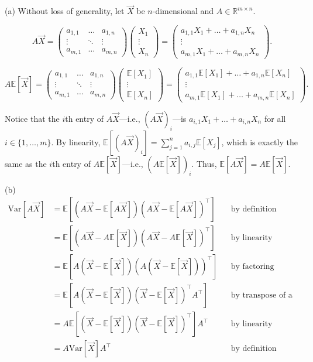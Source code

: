 \documentclass[12pt,oneside]{article}
\newcommand{\E}{\mathbb{E}}
\newcommand{\Var}{\text{Var}}
\newcommand{\R}{\mathbb{R}}
\theoremstyle{definition}
\theoremstyle{remark}
\begin{document}
\begin{solutionbox}
(a) Without loss of generality, let $\vec{X}$ be $n$-dimensional and $A \in \R^{m \times n}$.

\[
A \vec{X} = 
\begin{pmatrix}
a_{1, 1} & \ldots & a_{1, n} \\
\vdots & \ddots & \vdots \\
a_{m, 1} & \ldots & a_{m, n}
\end{pmatrix}
\begin{pmatrix}
X_{1} \\
\vdots \\
X_{n}
\end{pmatrix} = 
\begin{pmatrix}
a_{1, 1} X_{1} + \ldots + a_{1, n} X_{n} \\
\vdots \\
a_{m, 1} X_{1} + \ldots + a_{m, n} X_{n}
\end{pmatrix}.
\]

\[
A \E[\vec{X}] = 
\begin{pmatrix}
a_{1, 1} & \ldots & a_{1, n} \\
\vdots & \ddots & \vdots \\
a_{m, 1} & \ldots & a_{m, n}
\end{pmatrix}
\begin{pmatrix}
\E[X_{1}] \\
\vdots \\
\E[X_{n}]
\end{pmatrix} = 
\begin{pmatrix}
a_{1, 1} \E[X_{1}] + \ldots + a_{1, n} \E[X_{n}] \\
\vdots \\
a_{m, 1} \E[X_{1}] + \ldots + a_{m, n} \E[X_{n}]
\end{pmatrix}.
\]

Notice that the $i$th entry of $A \vec{X}$—i.e., $(A \vec{X})_{i}$—is $a_{i, 1} X_{1} + \ldots + a_{i, n} X_{n}$ for all $i \in \{1, \ldots, m\}$. By linearity, $\E[(A \vec{X})_i] = \sum_{j = 1}^{n} a_{i, j} \E[X_{j}]$, which is exactly the same as the $i$th entry of $A \E[\vec{X}]$—i.e., $(A \E[\vec{X}])_{i}$. Thus, $\E[A \vec{X}] = A \E[\vec{X}]$.

(b) 
\[
\begin{aligned}
\Var[A \vec{X}] &= \E[(A \vec{X} - \E[A \vec{X}])(A \vec{X} - \E[A \vec{X}])^{\top}] && \text{by definition} \\
&= \E[(A \vec{X} - A \E[\vec{X}])(A \vec{X} - A \E[\vec{X}])^{\top}] && \text{by linearity} \\
&= \E[A(\vec{X} - \E[\vec{X}])(A(\vec{X} - \E[\vec{X}]))^{\top}] && \text{by factoring} \\
&= \E[A(\vec{X} - \E[\vec{X}])(\vec{X} - \E[\vec{X}])^{\top} A^{\top}] && \text{by transpose of a product} \\
&= A \E[(\vec{X} - \E[\vec{X}])(\vec{X} - \E[\vec{X}])^{\top}] A^{\top} && \text{by linearity} \\
&= A \Var[\vec{X}] A^{\top} && \text{by definition}
\end{aligned}
\]


\end{solutionbox}
\end{document}
